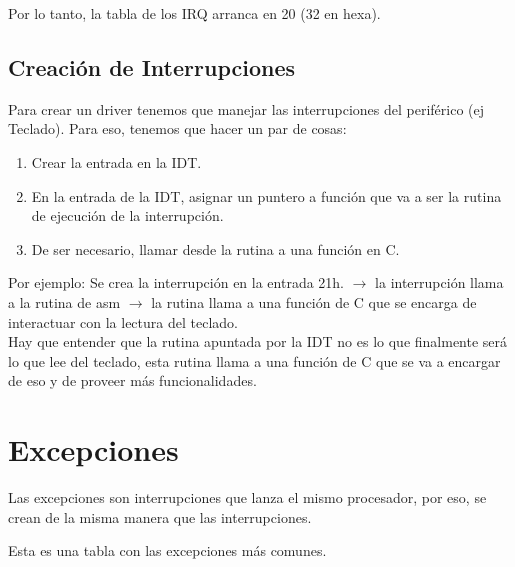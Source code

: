 \documentclass[]{article}
\begin{document}
Por lo tanto, la tabla de los IRQ arranca en 20 (32 en hexa).

\subsection*{Creaci\'on de Interrupciones}
Para crear un driver tenemos que manejar las interrupciones del perif\'erico (ej Teclado).
Para eso, tenemos que hacer un par de cosas:

\begin{center}
	\begin{enumerate}
		\item Crear la entrada en la IDT.
		\item En la entrada de la IDT, asignar un puntero a funci\'on que va a ser la rutina
		de ejecuci\'on de la interrupci\'on.
		\item De ser necesario, llamar desde la rutina a una funci\'on en C.
	\end{enumerate}
\end{center}

Por ejemplo: Se crea la interrupci\'on en la entrada 21h. $\longrightarrow$ la interrupci\'on llama a la rutina de asm $\longrightarrow$ la rutina llama a una funci\'on de C que se encarga de interactuar con la lectura del teclado.\\

Hay que entender que la rutina apuntada por la IDT no es lo que finalmente ser\'a lo que lee del teclado, esta rutina llama a una funci\'on de C que se va a encargar de eso y de proveer m\'as funcionalidades.

\section*{Excepciones}

Las excepciones son interrupciones que lanza el mismo procesador, por eso, se crean de la misma manera que las interrupciones.

Esta es una tabla con las excepciones m\'as comunes.
\end{document}

